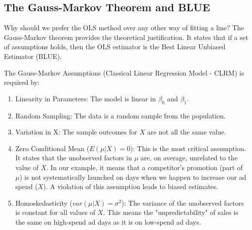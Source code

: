 \documentclass{article}
\begin{document}
\subsection{The Gauss-Markov Theorem and BLUE}

Why should we prefer the OLS method over any other way of fitting a line? The Gauss-Markov theorem provides the theoretical justification. It states that if a set of assumptions holds, then the OLS estimator is the Best Linear Unbiased Estimator (BLUE).

The Gauss-Markov Assumptions (Classical Linear Regression Model - CLRM) is required by:
\begin{enumerate}
  \item Linearity in Parameters: The model is linear in $\beta_0$ and $\beta_1$.
  \item Random Sampling: The data is a random sample from the population.
  \item Variation in X: The sample outcomes for $X$ are not all the same value.
  \item Zero Conditional Mean ($E(\mu|X) = 0$): This is the most critical assumption. It states that the unobserved factors in $\mu$ are, on average, unrelated to the value of $X$. In our example, it means that a competitor's promotion (part of $\mu$) is not systematically launched on days when we happen to increase our ad spend ($X$). A violation of this assumption leads to biased estimates.
  \item Homoskedasticity ($var(\mu|X) = \sigma^2$): The variance of the unobserved factors is constant for all values of $X$. This means the "unpredictability" of sales is the same on high-spend ad days as it is on low-spend ad days.
\end{enumerate}
\end{document}
